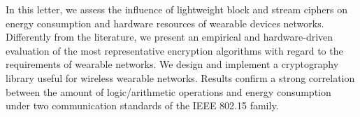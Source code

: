 In this letter, we assess the influence of lightweight block and stream ciphers on energy consumption and hardware resources of wearable devices networks. Differently from the literature, we present an empirical and hardware-driven evaluation of the most representative encryption algorithms with regard to the requirements of wearable networks. We design and implement a cryptography library useful for wireless wearable networks. Results confirm a strong correlation between the amount of logic/arithmetic operations and energy consumption under two communication standards of the IEEE 802.15 family. 